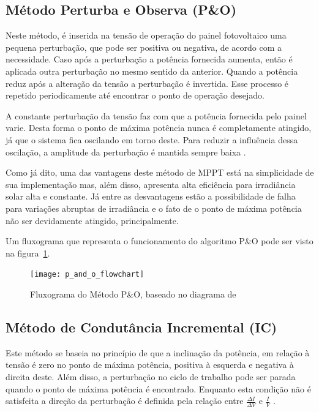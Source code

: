 \documentclass[
	12pt,				%
	openany,
	onseside,
	a4paper,			%
	english,			%
	french,				%
	spanish,			%
	brazil,				%
	]{abntex2}
\begin{document}
\subsection{Método Perturba e Observa (P\&O)}

Neste método, é inserida na tensão de operação do painel fotovoltaico uma pequena perturbação, que pode ser positiva ou negativa, de acordo com a necessidade. Caso após a perturbação a potência fornecida aumenta, então é aplicada outra perturbação no mesmo sentido da anterior. Quando a potência reduz após a alteração da tensão a perturbação é invertida. Esse processo é repetido periodicamente até encontrar o ponto de operação desejado\cite{Talha_MPPT}.

A constante perturbação da tensão faz com que a potência fornecida pelo painel varie. Desta forma o ponto de máxima potência nunca é completamente atingido, já que o sistema fica oscilando em torno deste. Para reduzir a influência dessa oscilação, a amplitude da perturbação é mantida sempre baixa \cite{MPPT_P&O_IC}.

Como já dito, uma das vantagens deste método de MPPT está na simplicidade de sua implementação mas, além disso, apresenta alta eficiência para irradiância solar alta e constante. Já entre as desvantagens estão a possibilidade de falha para variações abruptas de irradiância e o fato de o ponto de máxima potência não ser devidamente atingido, principalmente\cite{MPPT_P&O_IC}.

Um fluxograma que representa o funcionamento do algoritmo P\&O pode ser visto na figura~\ref{fig:PeO_Flux}.

\begin{figure}[H]
	\begin{center}
		\texttt{[image: p\_and\_o\_flowchart]}
		\caption{Fluxograma do Método P\&O, baseado no diagrama de }
		\label{fig:PeO_Flux}
	\end{center}
\end{figure}

\subsection{Método de Condutância Incremental (IC)}

Este método se baseia no princípio de que a inclinação da potência, em relação à tensão é zero no ponto de máxima potência, positiva à esquerda e negativa à direita deste. Além disso, a perturbação no ciclo de trabalho pode ser parada quando o ponto de máxima potência é encontrado. Enquanto esta condição não é satisfeita a direção da perturbação é definida pela relação entre $\frac{\Delta I}{\Delta V}$ e $\frac{I}{V}$ \cite{Talha_MPPT}\cite{MPPT_P&O_IC}.
\end{document}
